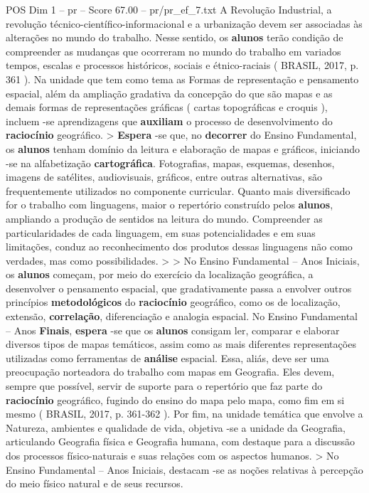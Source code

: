 \begin{textsample}{POS Dim 1 – pr – Score 67.00 – pr/pr\_ef\_7.txt}
A Revolução Industrial, a revolução técnico-científico-informacional e a urbanização devem ser associadas às alterações no mundo do trabalho.
Nesse sentido, os \textbf{alunos} terão condição de compreender as mudanças que ocorreram no mundo do trabalho em variados tempos, escalas e processos históricos, sociais e étnico-raciais ( BRASIL, 2017, p. 361 ).
Na unidade que tem como tema as Formas de representação e pensamento espacial, além da ampliação gradativa da concepção do que são mapas e as demais formas de representações gráficas ( cartas topográficas e croquis ), incluem -se aprendizagens que \textbf{auxiliam} o processo de desenvolvimento do \textbf{raciocínio} geográfico. > \textbf{Espera} -se que, no \textbf{decorrer} do Ensino Fundamental, os \textbf{alunos} tenham domínio da leitura e elaboração de mapas e gráficos, iniciando -se na alfabetização \textbf{cartográfica}.
Fotografias, mapas, esquemas, desenhos, imagens de satélites, audiovisuais, gráficos, entre outras alternativas, são frequentemente utilizados no componente curricular.
Quanto mais diversificado for o trabalho com linguagens, maior o repertório construído pelos \textbf{alunos}, ampliando a produção de sentidos na leitura do mundo.
Compreender as particularidades de cada linguagem, em suas potencialidades e em suas limitações, conduz ao reconhecimento dos produtos dessas linguagens não como verdades, mas como possibilidades. > > No Ensino Fundamental – Anos Iniciais, os \textbf{alunos} começam, por meio do exercício da localização geográfica, a desenvolver o pensamento espacial, que gradativamente passa a envolver outros princípios \textbf{metodológicos} do \textbf{raciocínio} geográfico, como os de localização, extensão, \textbf{correlação}, diferenciação e analogia espacial.
No Ensino Fundamental – Anos \textbf{Finais}, \textbf{espera} -se que os \textbf{alunos} consigam ler, comparar e elaborar diversos tipos de mapas temáticos, assim como as mais diferentes representações utilizadas como ferramentas de \textbf{análise} espacial.
Essa, aliás, deve ser uma preocupação norteadora do trabalho com mapas em Geografia.
Eles devem, sempre que possível, servir de suporte para o repertório que faz parte do \textbf{raciocínio} geográfico, fugindo do ensino do mapa pelo mapa, como fim em si mesmo ( BRASIL, 2017, p. 361-362 ).
Por fim, na unidade temática que envolve a Natureza, ambientes e qualidade de vida, objetiva -se a unidade da Geografia, articulando Geografia física e Geografia humana, com destaque para a discussão dos processos físico-naturais e suas relações com os aspectos humanos. > No Ensino Fundamental – Anos Iniciais, destacam -se as noções relativas à percepção do meio físico natural e de seus recursos.

\end{textsample}
